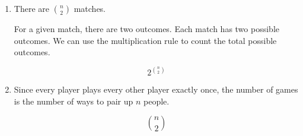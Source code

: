 \begin{enumerate}[label=(\alph*)]
\item There are ${n \choose 2}$ matches. 

For a given match, there are two outcomes. Each match has two possible outcomes. 
We can use the multiplication rule to count the total possible outcomes.

  $$ 2^{{n \choose 2}} $$

\item Since every player plays every other player exactly once, the number of 
games is the number of ways to pair up $n$ people.

  $$ {n \choose 2} $$
\end{enumerate}